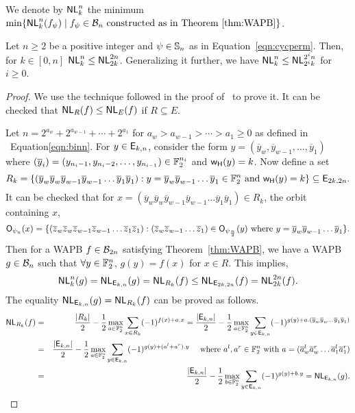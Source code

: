\documentclass{llncs}
\begin{document}
We denote by $\mathsf{NL}_{k}^n$ the minimum $\min\{\mathsf{NL}_{k}^n(f_\psi) \mid f_\psi \in \mathcal{B}_n  \text{ constructed as in Theorem~\ref{thm:WAPB}}\}$.
\begin{theorem}\label{thm:recbnd}
Let $n \geq 2$ be a positive integer and $\psi \in \mathbb{S}_n$ as in Equation~\ref{eqn:cycperm}. 
Then, for $k \in [0,n]$
$\mathsf{NL}_{k}^n \leq \mathsf{NL}_{2k}^{2n}$.
Generalizing it further, we have $\mathsf{NL}_{k}^n \leq \mathsf{NL}_{2^ik}^{2^in}$ for $i \geq 0$.
\end{theorem}
\begin{proof}
We use the technique followed in the proof of~\cite[Theorem-3.14]{DCC:LiuMes19} to prove it. It can be checked that $\mathsf{NL}_{R}(f) \leq \mathsf{NL}_{E}(f)$ if $R \subseteq E$.

Let $n =  2^{a_w} + 2^{a_{w-1}} + \cdots + 2^{a_1}$ for $ a_w > a_{w-1} > \cdots > a_1 \geq 0$ as defined in ~Equation\ref{eqn:binn}. For $y \in \mathsf{E}_{k,n}$, consider the form  $y = (\overline{y}_w, \overline{y}_{w-1}, \ldots,\overline{y}_1)$ where $(\overline{y}_i) = (y_{n_{i}-1},y_{n_{i}-2},\ldots , y_{n_{i-1}}) \in \mathbb{F}_2^{n_i}$ and $\mathsf{w_H}(y)=k$. Now define a set
$$R_k =\{(\overline{y}_w \overline{y}_w \overline{y}_{w-1} \overline{y}_{w-1} \ldots\overline{y}_1\overline{y}_1) : y = \overline{y}_w \overline{y}_{w-1} \ldots\overline{y}_1 \in \mathbb{F}_2^{n} \text{ and } \mathsf{w_H}(y) = k \} \subseteq \mathsf{E}_{2k,2n}.$$
It can be checked that for $x =  (\overline{y}_w \overline{y}_w \overline{y}_{w-1} \overline{y}_{w-1} \ldots\overline{y}_1\overline{y}_1) \in R_k$, the orbit containing $x$,
$$\mathsf{O}_{\psi_n}(x) = \{(\overline{z}_w \overline{z}_w \overline{z}_{w-1} \overline{z}_{w-1} \ldots\overline{z}_1\overline{z}_1) : (\overline{z}_w  \overline{z}_{w-1} \ldots\overline{z}_1) \in \mathsf{O}_{\psi_\frac{n}{2}}(y) \text{ where } y = \overline{y}_w \overline{y}_{w-1} \ldots\overline{y}_1\}.$$
Then for a WAPB $f \in \mathcal{B}_{2n}$ satisfying Theorem~\ref{thm:WAPB}, we have a WAPB $g \in \mathcal{B}_{n}$  such that $\forall y \in \mathbb{F}_2^{n}$,  $g(y) = f(x)$ for $x \in R$. This implies,
\begin{equation*}
\mathsf{NL}_{k}^{n}(g) = \mathsf{NL}_{\mathsf{E}_{k,n}}(g) = \mathsf{NL}_{R_k}(f) \leq \mathsf{NL}_{\mathsf{E}_{2k,2n}}(f) = \mathsf{NL}_{2k}^{2n}(f).
\end{equation*}
The equality $\mathsf{NL}_{\mathsf{E}_{k,n}}(g) = \mathsf{NL}_{R_k}(f)$ can be proved as follows.
\begin{eqnarray*}
\mathsf{NL}_{R_k}(f) & = & \frac{|R_k|}{2} - \frac{1}{2}\max\limits_{a \in \mathbb{F}_2^n}{\sum\limits_{x\in R_k} (-1)^{f(x)+a.x}} 
= \frac{|\mathsf{E}_{k,n}|}{2} - \frac{1}{2}\max\limits_{a \in \mathbb{F}_2^n}{\sum\limits_{y \in \mathsf{E}_{k,n}} (-1)^{g(y)+a.(\overline{y}_w \overline{y}_w \ldots \overline{y}_1 \overline{y}_1)}} \\
& = & \frac{|\mathsf{E}_{k,n}|}{2} - \frac{1}{2}\max\limits_{a \in \mathbb{F}_2^n}{\sum\limits_{y \in \mathsf{E}_{k,n}} (-1)^{g(y)+(a^l+a^r).y}} ~~~\text{ where } a^l,a^r \in \mathbb{F}_2^n \text{ with } a = (\overline{a}^l_w \overline{a}^r_w \ldots \overline{a}^l_1 \overline{a}^r_1)\\
& = & \frac{|\mathsf{E}_{k,n}|}{2} - \frac{1}{2}\max\limits_{b \in \mathbb{F}_2^{n}}{\sum\limits_{y \in \mathsf{E}_{k,n}} (-1)^{g(y)+b.y}} = \mathsf{NL}_{\mathsf{E}_{k,n}}(g).
\end{eqnarray*}


\end{proof}
\end{document}
